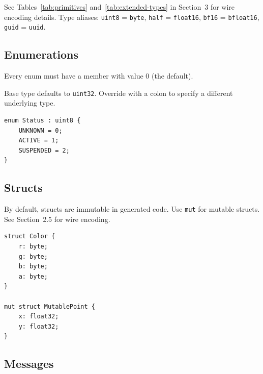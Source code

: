 \documentclass[10pt,onecolumn]{article}
\begin{document}
See Tables~\ref{tab:primitives} and~\ref{tab:extended-types} in Section~3 for wire encoding details. Type aliases: \texttt{uint8} = \texttt{byte}, \texttt{half} = \texttt{float16}, \texttt{bf16} = \texttt{bfloat16}, \texttt{guid} = \texttt{uuid}.

\subsection{Enumerations}

\begin{minipage}{\textwidth}
\begin{minipage}[t]{0.52\textwidth}
\raggedright
Every enum must have a member with value 0 (the default).

\vspace{6pt}
Base type defaults to \texttt{uint32}. Override with a colon to specify a different underlying type.
\end{minipage}\hfill
\begin{minipage}[t]{0.44\textwidth}
\begin{lstlisting}[language=bebop,aboveskip=0pt,belowskip=0pt]
enum Status : uint8 {
    UNKNOWN = 0;
    ACTIVE = 1;
    SUSPENDED = 2;
}
\end{lstlisting}
\end{minipage}
\end{minipage}


\subsection{Structs}

\begin{minipage}[t]{0.52\textwidth}
By default, structs are immutable in generated code. Use \texttt{mut} for mutable structs. See Section~2.5 for wire encoding.
\end{minipage}\hfill
\begin{minipage}[t]{0.44\textwidth}
\begin{lstlisting}[language=bebop,aboveskip=0pt,belowskip=0pt]
struct Color {
    r: byte;
    g: byte;
    b: byte;
    a: byte;
}

mut struct MutablePoint {
    x: float32;
    y: float32;
}
\end{lstlisting}
\end{minipage}


\subsection{Messages}
\end{document}

